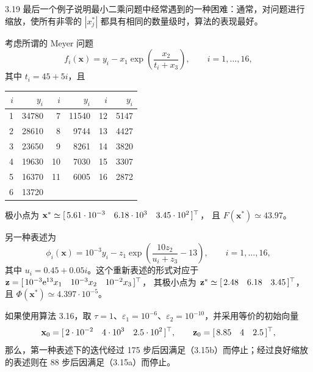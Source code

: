 \begin{example}{3.19}
最后一个例子说明最小二乘问题中经常遇到的一种困难：通常，对问题进行缩放，使所有非零的 $|x_j^*|$ 都具有相同的数量级时，算法的表现最好。

考虑所谓的 Meyer 问题
\[
  f_i(\mathbf x)=y_i-x_1\exp\left(\frac{x_2}{t_i+x_3}\right),
  \qquad i=1,\ldots,16,
\]
其中 $t_i=45+5i$，且
\begin{center}
  \begin{tabular}{rr|rr|rr}
    \hline
    $i$ & $y_i$ & $i$ & $y_i$ & $i$ & $y_i$\\
    \hline
    1 & 34780 & 7  & 11540 & 12 & 5147\\
    2 & 28610 & 8  & 9744  & 13 & 4427\\
    3 & 23650 & 9  & 8261  & 14 & 3820\\
    4 & 19630 & 10 & 7030  & 15 & 3307\\
    5 & 16370 & 11 & 6005  & 16 & 2872\\
    6 & 13720 &    &       &    &     \\
    \hline
  \end{tabular}
\end{center}
极小点为
$\mathbf x^*\simeq[\,5.61\cdot10^{-3}\quad6.18\cdot10^3\quad3.45\cdot10^2\,]^{\top}$，
且 $F(\mathbf x^*)\simeq43.97$。

另一种表述为
\[
  \phi_i(\mathbf x)=10^{-3}y_i-z_1
    \exp\left(\frac{10z_2}{u_i+z_3}-13\right),
  \qquad i=1,\ldots,16,
\]
其中 $u_i=0.45+0.05i$。这个重新表述的形式对应于
$\mathbf z=[\,10^{-3}\mathrm e^{13}x_1\quad10^{-3}x_2\quad10^{-2}x_3\,]^{\top}$，
其极小点为 $\mathbf z^*\simeq[\,2.48\quad6.18\quad3.45\,]^{\top}$，且
$\Phi(\mathbf x^*)\simeq4.397\cdot10^{-5}$。

如果使用算法 3.16，取 $\tau=1$、$\varepsilon_1=10^{-6}$、$\varepsilon_2=10^{-10}$，并采用等价的初始向量
\[
  \mathbf x_0=[\,2\cdot10^{-2}\quad4\cdot10^3\quad2.5\cdot10^2\,]^{\top},
  \qquad
  \mathbf z_0=[\,8.85\quad4\quad2.5\,]^{\top},
\]
那么，第一种表述下的迭代经过 175 步后因满足（3.15b）而停止；经过良好缩放的表述则在 88 步后因满足（3.15a）而停止。
\end{example}
